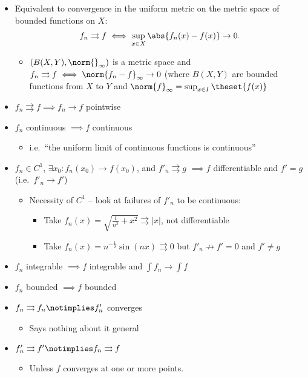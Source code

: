 \begin{itemize}
\item
  Equivalent to convergence in the uniform metric on the metric space of
  bounded functions on \(X\):
  \begin{align*}  
  f_n \rightrightarrows f \iff \sup_{x\in X} \abs{f_n(x) - f(x)} \to 0
  .\end{align*}

  \begin{itemize}
  \tightlist
  \item
    \((B(X,Y), \norm{}_\infty)\) is a metric space and
    \(f_n \rightrightarrows f \iff \norm{f_n - f}_\infty \to 0\) (where
    \(B(X,Y)\) are bounded functions from \(X\) to \(Y\) and
    \(\norm{f}_\infty = \sup_{x\in I}\theset{f(x)}\)
  \end{itemize}
\item
  \(f_n \rightrightarrows f \implies f_n \to f\) pointwise
\item
  \(f_n\) continuous \(\implies f\) continuous

  \begin{itemize}
  \tightlist
  \item
    i.e.~``the uniform limit of continuous functions is continuous''
  \end{itemize}
\item
  \(f_n \in C^1\), \(\exists x_0: f_n(x_0) \to f(x_0)\), and
  \(f'_n \rightrightarrows g\) \(\implies f\) differentiable and
  \(f' = g~\) (i.e.~\(f'_n \to f'\))

  \begin{itemize}
  \tightlist
  \item
    Necessity of \(C^1\) -- look at failures of \(f'_n\) to be
    continuous:

    \begin{itemize}
    \tightlist
    \item
      Take
      \(f_n(x) = \sqrt{\frac{1}{n^2} + x^2} \rightrightarrows |x|\), not
      differentiable
    \item
      Take \(f_n(x) = n^{-\frac{1}{2}}\sin(nx) \rightrightarrows 0\) but
      \(f'_n \not\to f' = 0\) and \(f' \neq g\)
    \end{itemize}
  \end{itemize}
\item
  \(f_n\) integrable \(\implies f\) integrable and
  \(\int f_n \to \int f\)
\item
  \(f_n\) bounded \(\implies f\) bounded
\item
  \(f_n \rightrightarrows f_n \notimplies f'_n\) converges

  \begin{itemize}
  \tightlist
  \item
    Says nothing about it general
  \end{itemize}
\item
  \(f_n' \rightrightarrows f' \notimplies f_n \rightrightarrows f\)

  \begin{itemize}
  \tightlist
  \item
    Unless \(f\) converges at one or more points.
  \end{itemize}
\end{itemize}

